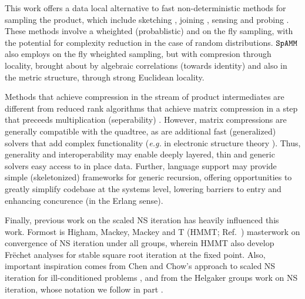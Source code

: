 \documentclass[letterpaper,twocolumn,amsmath,amsfont,amssymb,english,aps,jcp,preprintnumbers,groupaddress,nofootinbib,tightenlines,floatfix]{revtex4}
\newcommand{\mat}[1]{\boldsymbol{#1}}
\newcommand{\ot}{  {\scriptstyle \otimes}_{ \tau } }
\theoremstyle{plain}
\theoremstyle{remark}
\theoremstyle{plain}
\begin{document}
This work offers a data local alternative to fast non-deterministic methods for sampling the product, 
which include sketching \cite{Sarlos2006,Drineas2006,Mahoney2012,Pagh2013,Sivertsen2014,Woodruff2015},
joining \cite{Mishra92,Hoel94,Jacox03,Chen07,Amossen09,Lieberman08,Kim09}, 
sensing \cite{} and probing \cite{}.  These  methods involve a wheighted (probablistic) 
and on the fly sampling, with the potential for complexity reduction in the case of random distributions. 
$\tt SpAMM$ also employs on the fly wheighted sampling,  but with 
compresion through locality, brought about by algebraic correlations (towards identity) and also in the
metric structure, through strong Euclidean locality.

Methods that achieve compression in the stream of product intermediates are different from reduced rank algorithms that achieve 
matrix compression in a step that preceeds multiplication (seperability)  \cite{}.   However, matrix compressions are 
generally compatible with the quadtree, as are additional fast (generalized) solvers that add complex functionality ({\em e.g.} 
in electronic structure theory \cite{}).  Thus, generality 
and interoperability may enable deeply layered, thin and generic solvers easy access to in place data. 
Further, language support may provide simple (skeletonized) frameworks for generic recursion, 
offering opportunities to greatly simplify codebase at the systems level, 
lowering barriers to entry and enhancing concurence (in the Erlang sense). 


Finally, previous work on the scaled NS iteration has heavily influenced this work.  Formost is 
Higham, Mackey, Mackey and T (HMMT; Ref.~\cite{}) masterwork on convergence of NS iteration under all groups,
wherein HMMT also develop Fr\"{e}chet analyses for stable square root iteration at the fixed point.
Also, important inspiration comes from Chen and Chow's \cite{} approach to scaled NS iteration for ill-conditioned problems \cite{}, 
and from the Helgaker groups work on NS iteration, whose notation we follow in part \cite{}.  

\end{document}
